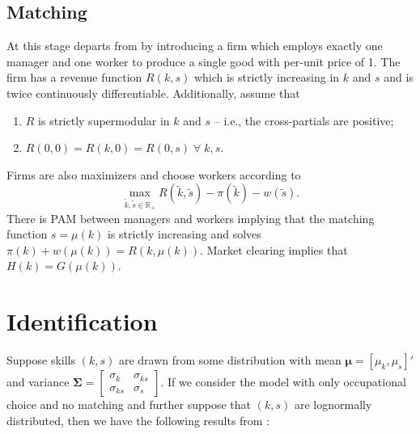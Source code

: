 \documentclass{article}
\begin{document}
\subsection{Matching}

At this stage \citet{mak2024occupational} departs from \citet{heckman1990empirical} by introducing a firm which employs exactly one manager and one worker to produce a single good with per-unit price of 1. The firm has a revenue function $R(k,s)$ which is strictly increasing in $k$ and $s$ and is twice continuously differentiable. Additionally, assume that
\begin{enumerate}
	\item $R$ is strictly supermodular in $k$ and $s$ -- i.e., the cross-partials are positive;
	\item $R(0,0) = R(k,0) = R(0,s) \; \forall \; k,s$.
\end{enumerate}

Firms are also maximizers and choose workers according to 
\begin{equation*}
	\max_{\tilde{k},\tilde{s}\in\mathbb{R}_+} R(\tilde{k},\tilde{s}) - \pi(\tilde{k}) - w(\tilde{s}).
\end{equation*}
There is PAM between managers and workers implying that the matching function $s=\mu(k)$ is strictly increasing and solves $\pi(k) + w(\mu(k)) = R(k,\mu(k))$. Market clearing implies that $H(k) = G(\mu(k))$.

\section{Identification}

Suppose skills $(k,s)$ are drawn from some distribution with mean $\bm{\mu} = [\mu_k,\mu_s]'$ and variance $\bm{\Sigma} = \begin{bmatrix}
	\sigma_k & \sigma_{ks} \\
	\sigma_{ks} & \sigma_s
\end{bmatrix}$. If we consider the model with only occupational choice and no matching and further suppose that $(k,s)$ are lognormally distributed, then we have the following results from \citet{heckman1990empirical}:
\end{document}
